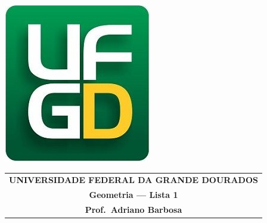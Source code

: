 \documentclass[a4paper,5pt]{amsbook}
\begin{document}
\thispagestyle{empty}
\pagestyle{empty}
\begin{minipage}[h]{0.14\textwidth}
	\includegraphics[scale=0.24]{../../ufgd.png}
\end{minipage}
\begin{minipage}[h]{\textwidth}
\begin{tabular}{c}
{{\bf UNIVERSIDADE FEDERAL DA GRANDE DOURADOS}}\\
{{\bf Geometria --- Lista 1}}\\
{{\bf Prof.\ Adriano Barbosa}}\\
\end{tabular}
\vspace{-0.45cm}
%
\end{minipage}

\end{document}
